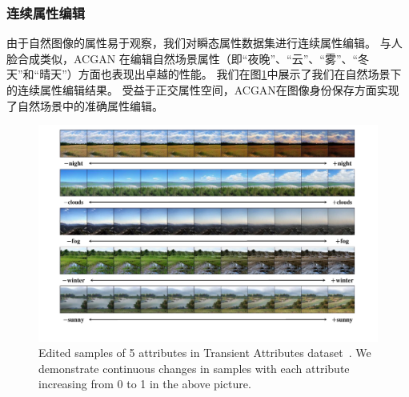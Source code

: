 \subsubsection{连续属性编辑}
由于自然图像的属性易于观察，我们对瞬态属性数据集进行连续属性编辑。 与人脸合成类似，ACGAN 在编辑自然场景属性（即“夜晚”、“云”、“雾”、“冬天”和“晴天”）方面也表现出卓越的性能。 我们在图\ref{fig:scene}中展示了我们在自然场景下的连续属性编辑结果。 受益于正交属性空间，ACGAN在图像身份保存方面实现了自然场景中的准确属性编辑。

\begin{figure}
    \begin{center}
         \includegraphics[width=0.85\linewidth]{figures/ACGAN/scene.pdf}
    \end{center}
    \caption{Edited samples of 5 attributes in Transient Attributes dataset~\cite{scenedataset}. We demonstrate continuous changes in samples with each attribute increasing from 0 to 1 in the above picture.}
    \label{fig:scene}
\end{figure}

